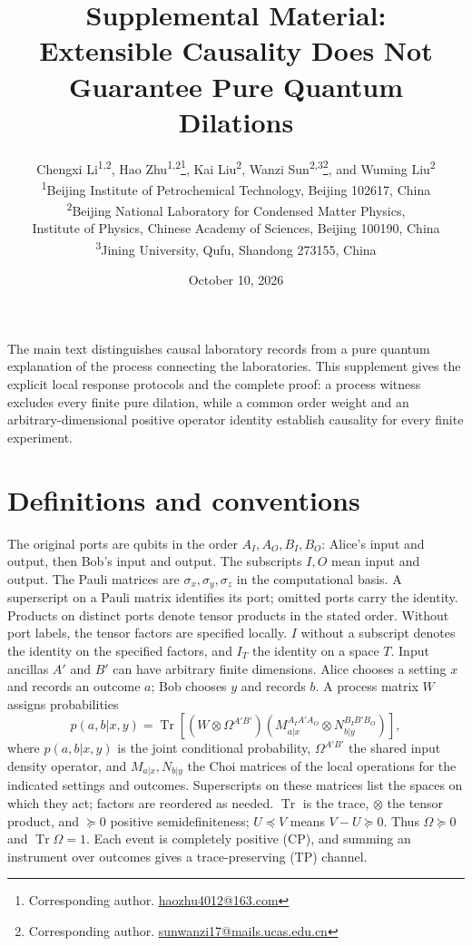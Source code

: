 \documentclass[11pt]{article}
\title{Supplemental Material:\\Extensible Causality Does Not Guarantee Pure Quantum Dilations}
\author{Chengxi Li\textsuperscript{1,2}, Hao Zhu\textsuperscript{1,2}\thanks{Corresponding author. \href{mailto:haozhu4012@163.com}{haozhu4012@163.com}}, Kai Liu\textsuperscript{2},
Wanzi Sun\textsuperscript{2,3}\thanks{Corresponding author. \href{mailto:sunwanzi17@mails.ucas.edu.cn}{sunwanzi17@mails.ucas.edu.cn}}, and Wuming Liu\textsuperscript{2}\\[0.5em]
\small\textsuperscript{1}Beijing Institute of Petrochemical Technology, Beijing 102617, China\\
\small\textsuperscript{2}Beijing National Laboratory for Condensed Matter Physics,\\
\small Institute of Physics, Chinese Academy of Sciences, Beijing 100190, China\\
\small\textsuperscript{3}Jining University, Qufu, Shandong 273155, China}
\date{October 10, 2026}
\newcommand{\Tr}{\operatorname{Tr}}
\begin{document}
\maketitle

The main text distinguishes causal laboratory records from a pure quantum explanation of the process connecting the laboratories. This supplement gives the explicit local response protocols and the complete proof: a process witness excludes every finite pure dilation, while a common order weight and an arbitrary-dimensional positive operator identity establish causality for every finite experiment.

\section{Definitions and conventions}
The original ports are qubits in the order $A_I,A_O,B_I,B_O$: Alice's input and output, then Bob's input and output. The subscripts $I,O$ mean input and output. The Pauli matrices are $\sigma_x,\sigma_y,\sigma_z$ in the computational basis. A superscript on a Pauli matrix identifies its port; omitted ports carry the identity. Products on distinct ports denote tensor products in the stated order. Without port labels, the tensor factors are specified locally. $I$ without a subscript denotes the identity on the specified factors, and $I_T$ the identity on a space $T$. Input ancillas $A'$ and $B'$ can have arbitrary finite dimensions. Alice chooses a setting $x$ and records an outcome $a$; Bob chooses $y$ and records $b$. A process matrix $W$ assigns probabilities
\begin{equation}
 p(a,b|x,y)=\Tr\!\left[(W\otimes\Omega^{A'B'})
 (M_{a|x}^{A_IA'A_O}\otimes N_{b|y}^{B_IB'B_O})\right],
 \label{eq:born}
\end{equation}
where $p(a,b|x,y)$ is the joint conditional probability, $\Omega^{A'B'}$ the shared input density operator, and $M_{a|x},N_{b|y}$ the Choi matrices of the local operations for the indicated settings and outcomes. Superscripts on these matrices list the spaces on which they act; factors are reordered as needed. $\Tr$ is the trace, $\otimes$ the tensor product, and $\succeq0$ positive semidefiniteness; $U\preceq V$ means $V-U\succeq0$. Thus $\Omega\succeq0$ and $\Tr\Omega=1$. Each event is completely positive (CP), and summing an instrument over outcomes gives a trace-preserving (TP) channel.
\end{document}
